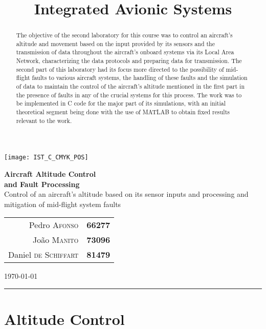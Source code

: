\documentclass[english,palatino]{ist-report}
\title{Integrated Avionic Systems}
\begin{document}
\thispagestyle{empty}

\begin{center}
	\texttt{[image: IST\_C\_CMYK\_POS]}
	
	\vspace*{3mm}
	{\huge \textbf{Aircraft Altitude Control\\and Fault Processing}} \\
	\vspace*{4mm}
	{\large Control of an aircraft's altitude based on its sensor inputs and processing and mitigation of mid-flight system faults}
	\vspace*{4mm} \\
	\begin{tabular}{r l}
		Pedro \textsc{Afonso} & \textbf{66277} \\
		João \textsc{Manito} & \textbf{73096} \\
		Daniel \textsc{de Schiffart} & \textbf{81479}
	\end{tabular}
	
	\vspace*{3mm}
	{\Large \today}
	\vspace*{4mm} \\
	\rule{\linewidth}{0.5pt}
\end{center}

\begin{abstract}
	The objective of the second laboratory for this course was to control an aircraft's altitude and movement based on the input provided by its sensors and the transmission of data throughout the aircraft's onboard systems via its Local Area Network, characterizing the data protocols and preparing data for transmission. The second part of this laboratory had its focus more directed to the possibility of mid-flight faults to various aircraft systems, the handling of these faults and the simulation of data to maintain the control of the aircraft's altitude mentioned in the first part in the presence of faults in any of the crucial systems for this process. The work was to be implemented in C code for the major part of its simulations, with an initial theoretical segment being done with the use of \textsc{MATLAB} to obtain fixed results relevant to the work.
\end{abstract}

{\hypersetup{linkcolor = black} \tableofcontents}

\part{Altitude Control}
\end{document}

